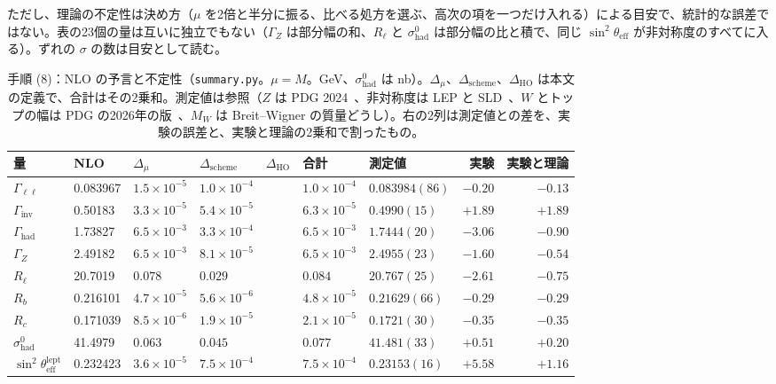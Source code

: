 \documentclass[a4paper,10pt]{ltjsarticle}
\begin{document}
ただし、理論の不定性は決め方（$\mu$ を2倍と半分に振る、比べる処方を選ぶ、高次の項を一つだけ入れる）による目安で、統計的な誤差ではない。表の23個の量は互いに独立でもない（$\Gamma_Z$ は部分幅の和、$R_\ell$ と $\sigma^0_{\mathrm{had}}$ は部分幅の比と積で、同じ $\sin^2\theta_{\mathrm{eff}}$ が非対称度のすべてに入る）。ずれの $\sigma$ の数は目安として読む。

\begin{table}[tbp]
\centering\footnotesize\setlength{\tabcolsep}{3.5pt}
\caption{手順 (8)：NLO の予言と不定性（\texttt{summary.py}。$\mu=M$。GeV、$\sigma^0_{\mathrm{had}}$ は nb）。$\Delta_\mu$、$\Delta_{\mathrm{scheme}}$、$\Delta_{\mathrm{HO}}$ は本文の定義で、合計はその2乗和。測定値は参照（$Z$ は PDG 2024~\cite{pdg24}、非対称度は LEP と SLD~\cite{lepewwg06}、$W$ とトップの幅は PDG の2026年の版~\cite{pdg26,pdg26t}、$M_W$ は Breit--Wigner の質量どうし）。右の2列は測定値との差を、実験の誤差と、実験と理論の2乗和で割ったもの。}
\label{tab:summary}
\begin{tabular}{lllllllrr}
\toprule
量 & NLO & $\Delta_\mu$ & $\Delta_{\mathrm{scheme}}$ & $\Delta_{\mathrm{HO}}$ & 合計 & 測定値 & 実験 & 実験と理論 \\
\midrule
$\Gamma_{\ell\ell}$ & 0.083967 & $1.5\times10^{-5}$ & $1.0\times10^{-4}$ & & $1.0\times10^{-4}$ & $0.083984(86)$ & $-0.20$ & $-0.13$ \\
$\Gamma_{\mathrm{inv}}$ & 0.50183 & $3.3\times10^{-5}$ & $5.4\times10^{-5}$ & & $6.3\times10^{-5}$ & $0.4990(15)$ & $+1.89$ & $+1.89$ \\
$\Gamma_{\mathrm{had}}$ & 1.73827 & $6.5\times10^{-3}$ & $3.3\times10^{-4}$ & & $6.5\times10^{-3}$ & $1.7444(20)$ & $-3.06$ & $-0.90$ \\
$\Gamma_Z$ & 2.49182 & $6.5\times10^{-3}$ & $8.1\times10^{-5}$ & & $6.5\times10^{-3}$ & $2.4955(23)$ & $-1.60$ & $-0.54$ \\
$R_\ell$ & 20.7019 & $0.078$ & $0.029$ & & $0.084$ & $20.767(25)$ & $-2.61$ & $-0.75$ \\
$R_b$ & 0.216101 & $4.7\times10^{-5}$ & $5.6\times10^{-6}$ & & $4.8\times10^{-5}$ & $0.21629(66)$ & $-0.29$ & $-0.29$ \\
$R_c$ & 0.171039 & $8.5\times10^{-6}$ & $1.9\times10^{-5}$ & & $2.1\times10^{-5}$ & $0.1721(30)$ & $-0.35$ & $-0.35$ \\
$\sigma^0_{\mathrm{had}}$ & 41.4979 & $0.063$ & $0.045$ & & $0.077$ & $41.481(33)$ & $+0.51$ & $+0.20$ \\
$\sin^2\theta^{\mathrm{lept}}_{\mathrm{eff}}$ & 0.232423 & $3.6\times10^{-5}$ & $7.5\times10^{-4}$ & & $7.5\times10^{-4}$ & $0.23153(16)$ & $+5.58$ & $+1.16$ \\

\end{tabular}
\end{table}
\end{document}
